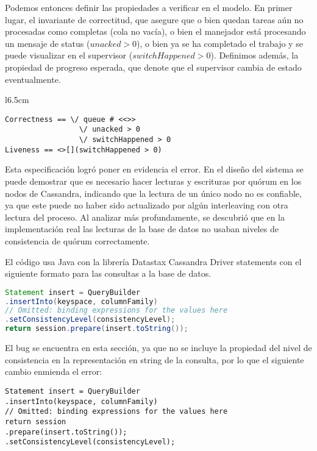 \documentclass[runningheads]{llncs}
\begin{document}
Podemos entonces definir las propiedades a verificar en el modelo. En primer lugar, el invariante de correctitud, que asegure que o bien quedan tareas aún no procesadas como completas (cola no vacía), o bien el manejador está procesando un mensaje de status (\(unacked > 0\)), o bien ya se ha completado el trabajo y se puede visualizar en el supervisor (\(switchHappened > 0\)). Definimos además, la propiedad de progreso esperada, que denote que el supervisor cambia de estado eventualmente.
\begin{wrapfigure}[5]{l}{6.5cm}
\begin{lstlisting}
Correctness == \/ queue # <<>>
                 \/ unacked > 0
                 \/ switchHappened > 0    
Liveness == <>[](switchHappened > 0)
\end{lstlisting}
\end{wrapfigure}

Esta especificación logró poner en evidencia el error. En el diseño del sistema se puede demostrar que es necesario hacer lecturas y escrituras por quórum en los nodos de Cassandra, indicando que la lectura de un único nodo no es confiable, ya que este puede no haber sido actualizado por algún interleaving con otra lectura del proceso. Al analizar más profundamente, se descubrió que en la implementación real las lecturas de la base de datos no usaban niveles de consistencia de quórum correctamente.

El código usa Java con la librería Datastax Cassandra Driver statements con el siguiente formato para las consultas a la base de datos.
\begin{lstlisting}[language=Java]
Statement insert = QueryBuilder
.insertInto(keyspace, columnFamily)
// Omitted: binding expressions for the values here
.setConsistencyLevel(consistencyLevel);
return session.prepare(insert.toString());
\end{lstlisting}

El bug se encuentra en esta sección, ya que no se incluye la propiedad del nivel de consistencia en la representación en string de la consulta, por lo que el siguiente cambio enmienda el error:
%
\begin{lstlisting}
Statement insert = QueryBuilder
.insertInto(keyspace, columnFamily)
// Omitted: binding expressions for the values here
return session
.prepare(insert.toString());
.setConsistencyLevel(consistencyLevel);
\end{lstlisting}
\end{document}
